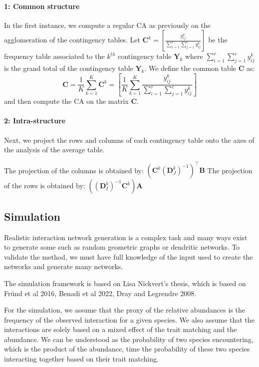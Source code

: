 \paragraph{1: Common structure}

In the first instance, we compute a regular CA as previously on the agglomeration of the contingency tables.
Let $\mathbf{C}^k = \left[ \frac{y_{ij}^k}{\sum_{i=1}^{r} \sum_{j=1}^{c} y_{ij}^k} \right]$ be the frequency table associated to the $k^{th}$ contingency table $\mathbf{Y}_k$ where $\sum_{i=1}^{r} \sum_{j=1}^{c} y_{ij}^k$ is the grand total of the contingency table $\mathbf{Y}_k$.
We define the common table $\mathbf{C}$ as:
$$
    \mathbf{C} = \frac{1}{K} \sum_{k=1}^K \mathbf{C}^k = \left[ \frac{1}{K}\sum_{k=1}^{K}\frac{y_{ij}^k}{\sum_{i=1}^{r} \sum_{j=1}^{c} y_{ij}^k} \right]
$$
and then compute the CA on the matrix $\mathbf{C}$.

\paragraph{2: Intra-structure}

Next, we project the rows and columns of each contingency table onto the axes of the analysis of the average table.

The  projection of the columns is obtained by: $\left( \mathbf{C}^k (\mathbf{D}_J^k)^{-1} \right)^\intercal\mathbf{B}$
The projection of the rows is obtained by: $\left( (\mathbf{D}_I^k)^{-1}\mathbf{C}^k \right) \mathbf{A}$



\subsection{Simulation}

Realistic interaction network generation is a complex task and many ways exist to generate some such as random geometric graphs or dendritic networks. To validate the method, we must have full knowledge of the input used to create the networks and generate many networks.

The simulation framework is based on Lisa Nickvert's thesis, which is based on Fründ et al 2016, Benadi et al 2022, Dray and Legrendre 2008.

For the simulation, we assume that the proxy of the relative abundances is the frequency of the observed interaction for a given species. We also assume that the interactions are solely based on a mixed effect of the trait matching and the abundance. We can be understood as the probability of two species encountering, which is the product of the abundance, time the probability of these two species interacting together based on their trait matching.

